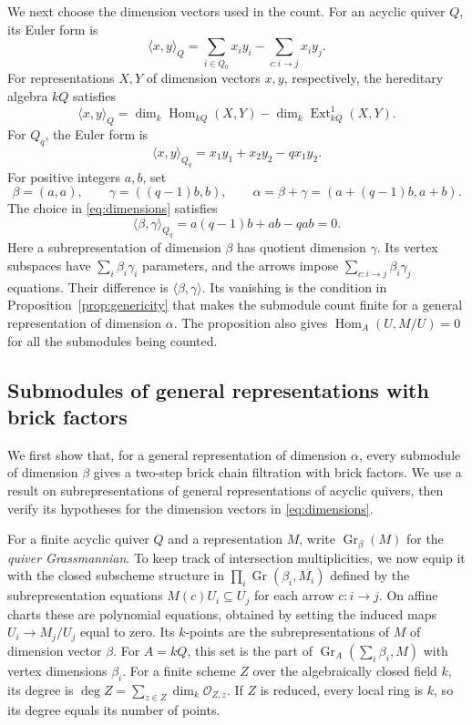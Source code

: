\documentclass[a4paper,reqno,10pt]{amsart}
\theoremstyle{definition}
\numberwithin{equation}{section}
\newcommand{\Hom}{\operatorname{Hom}}
\newcommand{\Ext}{\operatorname{Ext}}
\newcommand{\Gr}{\operatorname{Gr}}
\begin{document}
We next choose the dimension vectors used in the count. For an acyclic
quiver $Q$, its Euler form is
\begin{equation}\label{eq:euler-form}
 \langle x,y\rangle_Q
   =\sum_{i\in Q_0}x_i y_i-\sum_{c:i\to j}x_i y_j.
\end{equation}
For representations $X,Y$ of dimension vectors $x,y$, respectively,
the hereditary algebra $kQ$ satisfies \cite[Section~2]{DSW}
\begin{equation}\label{eq:euler-hom-ext}
 \langle x,y\rangle_Q
   =\dim_k\Hom_{kQ}(X,Y)-\dim_k\Ext^1_{kQ}(X,Y).
\end{equation}
For $Q_q$, the Euler form is
\[
 \langle x,y\rangle_{Q_q}=x_1y_1+x_2y_2-qx_1y_2.
\]
For positive integers $a,b$, set
\begin{equation}\label{eq:dimensions}
 \beta=(a,a),\qquad \gamma=((q-1)b,b),\qquad
 \alpha=\beta+\gamma=(a+(q-1)b,a+b).
\end{equation}
The choice in \eqref{eq:dimensions} satisfies
\[
 \langle\beta,\gamma\rangle_{Q_q}
   =a(q-1)b+ab-qab=0.
\]
Here a subrepresentation of dimension $\beta$ has quotient dimension
$\gamma$. Its vertex subspaces have $\sum_i\beta_i\gamma_i$ parameters,
and the arrows impose $\sum_{c:i\to j}\beta_i\gamma_j$ equations.
Their difference is $\langle\beta,\gamma\rangle$. Its vanishing is
the condition in
Proposition~\ref{prop:genericity} that makes the submodule count finite
for a general representation of dimension $\alpha$. The proposition
also gives $\Hom_A(U,M/U)=0$ for all the submodules being counted.

\subsection{Submodules of general representations with brick factors}

We first show that, for a general representation of dimension $\alpha$,
every submodule of dimension $\beta$ gives a two-step brick chain
filtration with brick factors. We use a result on subrepresentations of
general representations of acyclic quivers, then verify its hypotheses
for the dimension vectors in \eqref{eq:dimensions}.

For a finite acyclic quiver $Q$ and a representation $M$, write
$\Gr_\beta(M)$ for the \emph{quiver Grassmannian}. To keep track of
intersection multiplicities, we now equip it with the closed subscheme
structure in $\prod_i\Gr(\beta_i,M_i)$
defined by the subrepresentation equations $M(c)U_i\subseteq U_j$ for
each arrow $c:i\to j$. On affine charts these are polynomial equations,
obtained by setting the induced maps $U_i\to M_j/U_j$ equal to zero.
Its $k$-points are the subrepresentations of $M$ of dimension vector
$\beta$. For $A=kQ$, this set is the part of
$\Gr_A(\sum_i\beta_i,M)$ with vertex dimensions $\beta_i$.
For a finite scheme $Z$ over the
algebraically closed field $k$, its degree is
$\deg Z=\sum_{z\in Z}\dim_k\mathcal O_{Z,z}$.
If $Z$ is reduced, every local ring is $k$, so its degree equals its
number of points.
\end{document}
